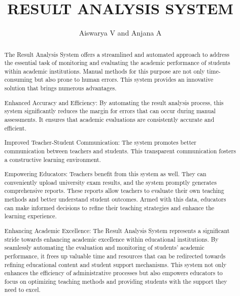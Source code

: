 \documentclass{nascproject}
\title{RESULT ANALYSIS SYSTEM}
\author{Aiswarya V and Anjana A}
\begin{document}
\lstset{
	basicstyle=\ttfamily\footnotesize,
	breakatwhitespace=false,         
	breaklines=true,                 
	keepspaces=true,                 
	numbers=none,                    
	numbersep=5pt,                  
	showspaces=false,                
	showstringspaces=false,
	showtabs=false,                  
	tabsize=2,
	upquote=true,
}
\maketitle

\makecert

\newpage
\setcounter{page}{1}
\renewcommand\abstractname{ABSTRACT}
\begin{abstract}
The Result Analysis System offers a streamlined and automated approach to address the essential task of monitoring and evaluating the academic performance of students within academic institutions. Manual methods for this purpose are not only time-consuming but also prone to human errors. This system provides an innovative solution that brings numerous advantages.

Enhanced Accuracy and Efficiency: By automating the result analysis process, this system significantly reduces the margin for errors that can occur during manual assessments. It ensures that academic evaluations are consistently accurate and efficient.

Improved Teacher-Student Communication: The system promotes better communication between teachers and students. This transparent communication fosters a constructive learning environment.

Empowering Educators: Teachers benefit from this system as well. They can conveniently upload university exam results, and the system promptly generates comprehensive reports. These reports allow teachers to evaluate their own teaching methods and better understand student outcomes. Armed with this data, educators can make informed decisions to refine their teaching strategies and enhance the learning experience.

Enhancing Academic Excellence: The Result Analysis System represents a significant stride towards enhancing academic excellence within educational institutions. By seamlessly automating the evaluation and monitoring of students' academic performance, it frees up valuable time and resources that can be redirected towards refining educational content and student support mechanisms. This system not only enhances the efficiency of administrative processes but also empowers educators to focus on optimizing teaching methods and providing students with the support they need to excel.



\end{abstract}
\end{document}
